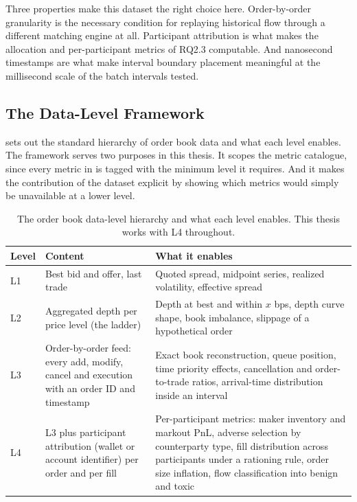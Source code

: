 Three properties make this dataset the right choice here. Order-by-order
granularity is the necessary condition for replaying historical flow
through a different matching engine at all. Participant attribution is
what makes the allocation and per-participant metrics of RQ2.3
computable. And nanosecond timestamps are what make interval boundary
placement meaningful at the millisecond scale of the batch intervals
tested.

\subsection{The Data-Level Framework}

 sets out the standard hierarchy of order book data and
what each level enables. The framework serves two purposes in this
thesis. It scopes the metric catalogue, since every metric in
 is tagged with the minimum level it requires. And it
makes the contribution of the dataset explicit by showing which metrics
would simply be unavailable at a lower level.

\begin{table}[htbp]
\centering
\caption[Order book data levels]{The order book data-level hierarchy
and what each level enables. This thesis works with L4 throughout.}
\label{tab:levels}
\small
\begin{tabularx}{\textwidth}{@{}p{1.0cm} p{4.2cm} L@{}}
\toprule
\textbf{Level} & \textbf{Content} & \textbf{What it enables}\\
\midrule
L1 & Best bid and offer, last trade & Quoted spread, midpoint series,
realized volatility, effective spread\\
L2 & Aggregated depth per price level (the ladder) & Depth at best and
within $x$ bps, depth curve shape, book imbalance, slippage of a
hypothetical order\\
L3 & Order-by-order feed: every add, modify, cancel and execution with
an order ID and timestamp & Exact book reconstruction, queue position,
time priority effects, cancellation and order-to-trade ratios,
arrival-time distribution inside an interval\\
L4 & L3 plus participant attribution (wallet or account identifier) per
order and per fill & Per-participant metrics: maker inventory and
markout PnL, adverse selection by counterparty type, fill distribution
across participants under a rationing rule, order size inflation, flow
classification into benign and toxic\\
\bottomrule
\end{tabularx}
\end{table}

